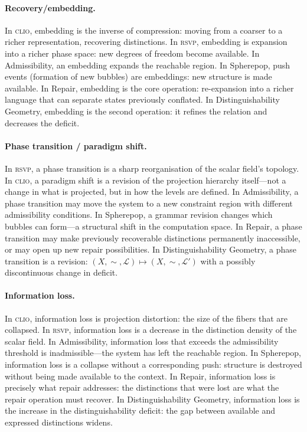 \documentclass[12pt, letterpaper]{article}
\theoremstyle{remark}
\newcommand{\rsvp}{\textsc{rsvp}}
\newcommand{\clio}{\textsc{clio}}
\begin{document}
\paragraph{Recovery/embedding.}
In \clio{}, embedding is the inverse of compression: moving from a coarser
to a richer representation, recovering distinctions.
In \rsvp{}, embedding is expansion into a richer phase space: new degrees
of freedom become available.
In Admissibility, an embedding expands the reachable region.
In Spherepop, push events (formation of new bubbles) are embeddings: new
structure is made available.
In Repair, embedding is the core operation: re-expansion into a richer
language that can separate states previously conflated.
In Distinguishability Geometry, embedding is the second operation: it
refines the relation and decreases the deficit.

\paragraph{Phase transition / paradigm shift.}
In \rsvp{}, a phase transition is a sharp reorganisation of the scalar
field's topology.
In \clio{}, a paradigm shift is a revision of the projection hierarchy
itself---not a change in what is projected, but in how the levels are
defined.
In Admissibility, a phase transition may move the system to a new
constraint region with different admissibility conditions.
In Spherepop, a grammar revision changes which bubbles can form---a
structural shift in the computation space.
In Repair, a phase transition may make previously recoverable distinctions
permanently inaccessible, or may open up new repair possibilities.
In Distinguishability Geometry, a phase transition is a revision:
$(X, \sim, \mathcal{L}) \mapsto (X, \sim, \mathcal{L}')$ with a
possibly discontinuous change in deficit.

\paragraph{Information loss.}
In \clio{}, information loss is projection distortion: the size of the
fibers that are collapsed.
In \rsvp{}, information loss is a decrease in the distinction density of
the scalar field.
In Admissibility, information loss that exceeds the admissibility threshold
is inadmissible---the system has left the reachable region.
In Spherepop, information loss is a collapse without a corresponding push:
structure is destroyed without being made available to the context.
In Repair, information loss is precisely what repair addresses: the
distinctions that were lost are what the repair operation must recover.
In Distinguishability Geometry, information loss is the increase in the
distinguishability deficit: the gap between available and expressed
distinctions widens.
\end{document}
